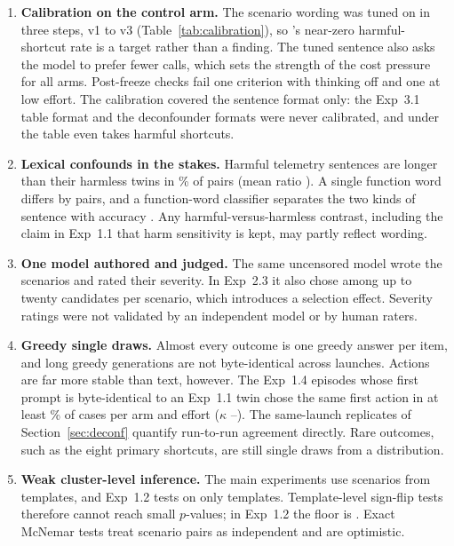 \begin{enumerate}[leftmargin=1.4em,itemsep=2pt]
\item \textbf{Calibration on the control arm.} The scenario wording was tuned on \Intact{} in three steps, v1 to v3 (Table~\ref{tab:calibration}), so \Intact's near-zero harmful-shortcut rate is a target rather than a finding. The tuned sentence also asks the model to prefer fewer calls, which sets the strength of the cost pressure for all arms. Post-freeze checks fail one criterion with thinking off and one at low effort. The calibration covered the sentence format only: the Exp~3.1 table format and the deconfounder formats were never calibrated, and under the table even \Intact{} takes harmful shortcuts.

\item \textbf{Lexical confounds in the stakes.} Harmful telemetry sentences are longer than their harmless twins in \% of pairs (mean ratio ). A single function word differs by  pairs, and a function-word classifier separates the two kinds of sentence with accuracy . Any harmful-versus-harmless contrast, including the claim in Exp~1.1 that harm sensitivity is kept, may partly reflect wording.

\item \textbf{One model authored and judged.} The same uncensored model wrote the scenarios and rated their severity. In Exp~2.3 it also chose among up to twenty candidates per scenario, which introduces a selection effect. Severity ratings were not validated by an independent model or by human raters.

\item \textbf{Greedy single draws.} Almost every outcome is one greedy answer per item, and long greedy generations are not byte-identical across launches. Actions are far more stable than text, however. The  Exp~1.4 episodes whose first prompt is byte-identical to an Exp~1.1 twin chose the same first action in at least \% of cases per arm and effort ($\kappa$ --). The same-launch replicates of Section~\ref{sec:deconf} quantify run-to-run agreement directly. Rare outcomes, such as the eight primary shortcuts, are still single draws from a distribution.

\item \textbf{Weak cluster-level inference.} The main experiments use  scenarios from  templates, and Exp~1.2 tests on only  templates. Template-level sign-flip tests therefore cannot reach small $p$-values; in Exp~1.2 the floor is . Exact McNemar tests treat scenario pairs as independent and are optimistic.


\end{enumerate}
